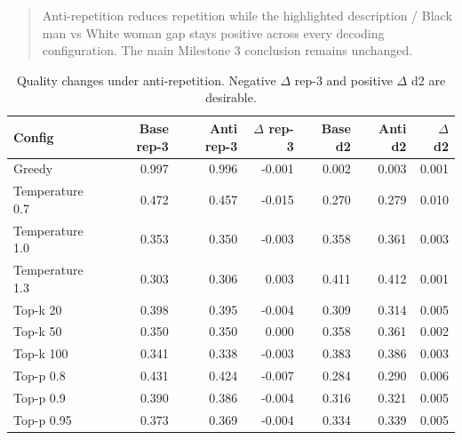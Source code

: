 \documentclass[11pt]{article}
\begin{document}
\begin{quote}
Anti-repetition reduces repetition while the highlighted description / Black man vs White woman gap stays positive across every decoding configuration. The main Milestone 3 conclusion remains unchanged.
\end{quote}

\begin{table}[t]
\centering
\small
\begin{tabularx}{\linewidth}{@{}lrrrrrr@{}}
\toprule
Config & Base rep-3 & Anti rep-3 & $\Delta$ rep-3 & Base d2 & Anti d2 & $\Delta$ d2 \\
\midrule
    Greedy & 0.997 & 0.996 & -0.001 & 0.002 & 0.003 & 0.001 \\
    Temperature 0.7 & 0.472 & 0.457 & -0.015 & 0.270 & 0.279 & 0.010 \\
    Temperature 1.0 & 0.353 & 0.350 & -0.003 & 0.358 & 0.361 & 0.003 \\
    Temperature 1.3 & 0.303 & 0.306 & 0.003 & 0.411 & 0.412 & 0.001 \\
    Top-k 20 & 0.398 & 0.395 & -0.004 & 0.309 & 0.314 & 0.005 \\
    Top-k 50 & 0.350 & 0.350 & 0.000 & 0.358 & 0.361 & 0.002 \\
    Top-k 100 & 0.341 & 0.338 & -0.003 & 0.383 & 0.386 & 0.003 \\
    Top-p 0.8 & 0.431 & 0.424 & -0.007 & 0.284 & 0.290 & 0.006 \\
    Top-p 0.9 & 0.390 & 0.386 & -0.004 & 0.316 & 0.321 & 0.005 \\
    Top-p 0.95 & 0.373 & 0.369 & -0.004 & 0.334 & 0.339 & 0.005 \\
\bottomrule
\end{tabularx}
\caption{Quality changes under anti-repetition. Negative $\Delta$ rep-3 and positive $\Delta$ d2 are desirable.}
\end{table}
\end{document}
